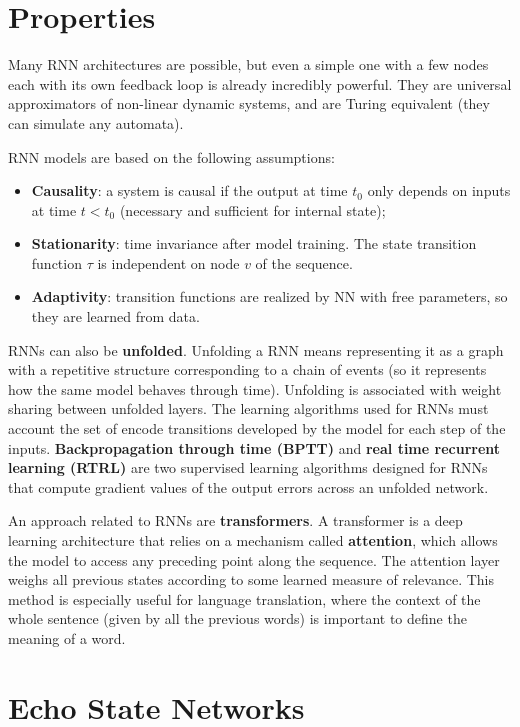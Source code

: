 \section{Properties}

Many RNN architectures are possible, but even a simple one with a few nodes each with its own feedback loop is already incredibly powerful. They are universal approximators of non-linear dynamic systems, and are Turing equivalent (they can simulate any automata).

RNN models are based on the following assumptions:
\begin{itemize}
    \item \textbf{Causality}: a system is causal if the output at time $t_0$ only depends on inputs at time $t<t_0$ (necessary and sufficient for internal state);

    \item \textbf{Stationarity}: time invariance after model training. The state transition function $\tau$ is independent on node $v$ of the sequence.

    \item \textbf{Adaptivity}: transition functions are realized by NN with free parameters, so they are learned from data.
\end{itemize}

RNNs can also be \textbf{unfolded}. Unfolding a RNN means representing it as a graph with a repetitive structure corresponding to a chain of events (so it represents how the same model behaves through time). Unfolding is associated with weight sharing between unfolded layers. The learning algorithms used for RNNs must account the set of encode transitions developed by the model for each step of the inputs. \textbf{Backpropagation through time (BPTT)} and \textbf{real time recurrent learning (RTRL)} are two supervised learning algorithms designed for RNNs that compute gradient values of the output errors across an unfolded network.

An approach related to RNNs are \textbf{transformers}. A transformer is a deep learning architecture that relies on a mechanism called \textbf{attention}, which allows the model to access any preceding point along the sequence. The attention layer weighs all previous states according to some learned measure of relevance. This method is especially useful for language translation, where the context of the whole sentence (given by all the previous words) is important to define the meaning of a word.

\section{Echo State Networks}

